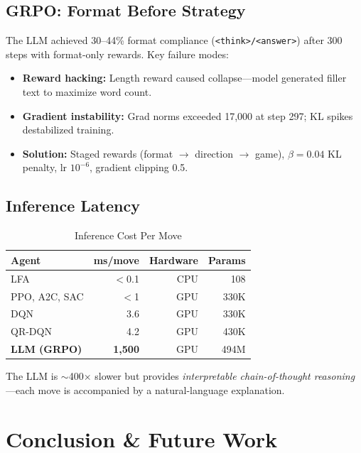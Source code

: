\documentclass[conference, 10pt]{IEEEtran}
\begin{document}
\subsection{GRPO: Format Before Strategy}

The LLM achieved 30--44\% format compliance (\texttt{<think>/<answer>}) after 300 steps with format-only rewards.  Key failure modes:
\begin{itemize}[nosep,leftmargin=*]
    \item \textbf{Reward hacking:} Length reward caused collapse---model generated filler text to maximize word count.
    \item \textbf{Gradient instability:} Grad norms exceeded 17,000 at step 297; KL spikes destabilized training.
    \item \textbf{Solution:} Staged rewards (format $\to$ direction $\to$ game), $\beta{=}0.04$ KL penalty, lr $10^{-6}$, gradient clipping 0.5.
\end{itemize}

\subsection{Inference Latency}

\begin{table}[h]
\centering
\caption{Inference Cost Per Move}
\label{tab:latency}
\setlength{\tabcolsep}{5pt}
\begin{tabular}{@{}lrrr@{}}
\toprule
\textbf{Agent} & \textbf{ms/move} & \textbf{Hardware} & \textbf{Params} \\
\midrule
LFA & $<$0.1 & CPU & 108 \\
PPO, A2C, SAC & $<$1 & GPU & 330K \\
DQN & 3.6 & GPU & 330K \\
QR-DQN & 4.2 & GPU & 430K \\
\textbf{LLM (GRPO)} & \textbf{1,500} & GPU & 494M \\
\bottomrule
\end{tabular}
\end{table}

The LLM is $\sim$400$\times$ slower but provides \emph{interpretable chain-of-thought reasoning}---each move is accompanied by a natural-language explanation.

\section{Conclusion \& Future Work}
\label{sec:conclusion}
\end{document}
